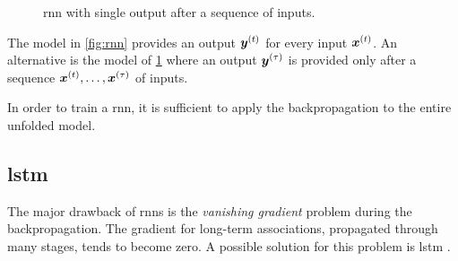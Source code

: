 \begin{figure}
  \centering
  \caption{\ac{rnn} with single output after a sequence of inputs.}
  \label{fig:rnnSO}
\end{figure}
The model in \cref{fig:rnn} provides an output $\bm{y}^{(t)}$ for every
input $\bm{x}^{(t)}$. An alternative is the model of
\cref{fig:rnnSO} where an output $\bm{y}^{(\tau)}$ is provided only
after a sequence $\bm{x}^{(t)},\dots,\bm{x}^{(\tau)}$ of inputs.

In order to train a \ac{rnn}, it is sufficient to apply the
backpropagation to the entire unfolded model.

\subsection{\acf{lstm}}
The major drawback of \acp{rnn} is the \emph{vanishing
  gradient} problem during the backpropagation. The gradient
for long-term associations, propagated through many stages, tends to
become zero. A possible solution for this problem is \ac{lstm} \cite{hochreiter1997long}.

